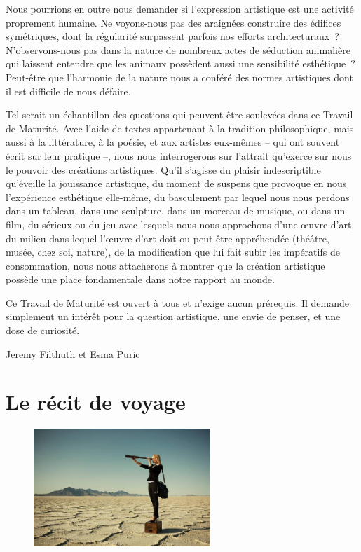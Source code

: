 \documentclass[
  10pt,
  french,
  a5paper,
  openany]{book}
\newenvironment{signature}{\begin{flushright}}{\end{flushright}}
\begin{document}
Nous pourrions en outre nous demander si l'expression artistique est une activité proprement humaine. Ne voyons-nous pas des araignées construire des édifices symétriques, dont la régularité surpassent parfois nos efforts architecturaux~? N'observons-nous pas dans la nature de nombreux actes de séduction animalière qui laissent entendre que les animaux possèdent aussi une sensibilité esthétique~? Peut-être que l'harmonie de la nature nous a conféré des normes artistiques dont il est difficile de nous défaire.

Tel serait un échantillon des questions qui peuvent être soulevées dans ce Travail de Maturité. Avec l'aide de textes appartenant à la tradition philosophique, mais aussi à la littérature, à la poésie, et aux artistes eux-mêmes -- qui ont souvent écrit sur leur pratique --, nous nous interrogerons sur l'attrait qu'exerce sur nous le pouvoir des créations artistiques. Qu'il s'agisse du plaisir indescriptible qu'éveille la jouissance artistique, du moment de suspens que provoque en nous l'expérience esthétique elle-même, du basculement par lequel nous nous perdons dans un tableau, dans une sculpture, dans un morceau de musique, ou dans un film, du sérieux ou du jeu avec lesquels nous nous approchons d'une œuvre d'art, du milieu dans lequel l'œuvre d'art doit ou peut être appréhendée (théâtre, musée, chez soi, nature), de la modification que lui fait subir les impératifs de consommation, nous nous attacherons à montrer que la création artistique possède une place fondamentale dans notre rapport au monde.

Ce Travail de Maturité est ouvert à tous et n'exige aucun prérequis. Il demande simplement un intérêt pour la question artistique, une envie de penser, et une dose de curiosité.

\begin{signature}
Jeremy Filthuth et Esma Puric

\end{signature}

\hypertarget{le-ruxe9cit-de-voyage}{%
\chapter{Le récit de voyage}\label{le-ruxe9cit-de-voyage}}

\begin{figure}

{\centering \includegraphics[height=12em]{images/le-recit-de-voyage} 

}

\end{figure}
\end{document}
